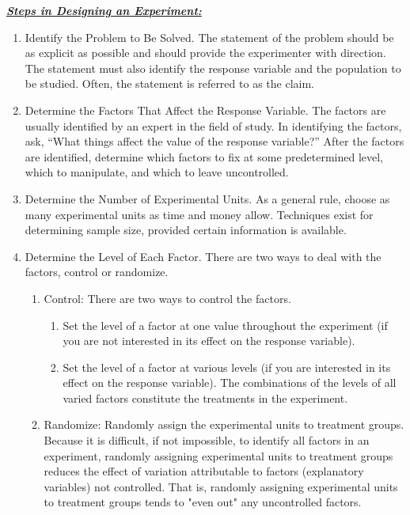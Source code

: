 \documentclass{report}
\begin{document}
        \bigbreak \noindent 
        \textbf{\textit{\underline{Steps in Designing an Experiment:}}}
        \bigbreak \noindent 
        \begin{enumerate}
            \item Identify the Problem to Be Solved. The statement of the problem should be as explicit as possible and should provide the experimenter with direction. The statement must also identify the response variable and the population to be studied. Often, the statement is referred to as the claim.
            \item Determine the Factors That Affect the Response Variable. The factors are usually identified by an expert in the field of study. In identifying the factors, ask, “What things affect the value of the response variable?” After the factors are identified, determine which factors to fix at some predetermined level, which to manipulate, and which to leave uncontrolled.
            \item Determine the Number of Experimental Units. As a general rule, choose as many experimental units as time and money allow. Techniques exist for determining sample size, provided certain information is available.
            \item Determine the Level of Each Factor. There are two ways to deal with the factors, control or randomize.
                \begin{enumerate}
                    \item Control: There are two ways to control the factors.
                        \begin{enumerate}[label=\alph*.)]
                            \item Set the level of a factor at one value throughout the experiment (if you are not interested in its effect on the response variable).
                            \item Set the level of a factor at various levels (if you are interested in its effect on the response variable). The combinations of the levels of all varied factors constitute the treatments in the experiment.
                        \end{enumerate}
                    \item Randomize: Randomly assign the experimental units to treatment groups.  Because it is difficult, if not impossible, to identify all factors in an experiment, randomly assigning experimental units to treatment groups reduces the effect of variation attributable to factors (explanatory variables) not controlled. That is, randomly assigning experimental units to treatment groups tends to "even out" any uncontrolled factors.

\end{enumerate}
\end{enumerate}
\end{document}
